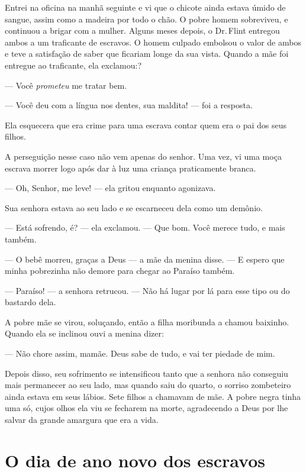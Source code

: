 Entrei na oficina na manhã seguinte e
vi que o chicote ainda estava úmido de sangue, assim como a madeira por
todo o chão. O pobre homem sobreviveu, e continuou a brigar com a
mulher. Alguns meses depois, o Dr.\,Flint entregou ambos a um traficante
de escravos. O homem culpado embolsou o valor de ambos e teve a
satisfação de saber que ficariam longe da sua vista. Quando a mãe foi
entregue ao traficante, ela exclamou:?

--- Você \emph{prometeu} me tratar bem.

--- Você deu com a língua nos dentes, sua maldita! --- foi a resposta.

Ela esquecera que era crime para uma escrava contar quem era o pai dos
seus filhos.

A perseguição nesse caso não vem apenas
do senhor. Uma vez, vi uma moça escrava morrer logo após dar à luz uma
criança praticamente branca.

--- Oh, Senhor, me leve! --- ela gritou enquanto agonizava.

Sua senhora estava ao seu lado e se escarneceu dela como um demônio.

--- Está sofrendo, é? --- ela exclamou. --- Que bom. Você merece tudo, e
mais também.

--- O bebê morreu, graças a Deus --- a
mãe da menina disse. --- E espero que minha pobrezinha não demore para
chegar ao Paraíso também.

--- Paraíso! --- a senhora retrucou.
--- Não há lugar por lá para esse tipo ou do bastardo dela.

A pobre mãe se virou, soluçando, então
a filha moribunda a chamou baixinho. Quando ela se inclinou ouvi a
menina dizer:

--- Não chore assim, mamãe. Deus sabe de tudo, e  vai ter piedade de
mim.

Depois disso, seu sofrimento se
intensificou tanto que a senhora não conseguiu mais permanecer ao seu
lado, mas quando saiu do quarto, o sorriso zombeteiro ainda estava em
seus lábios. Sete filhos a chamavam de mãe. A pobre negra tinha uma só,
cujos olhos ela viu se fecharem na morte, agradecendo a Deus por lhe
salvar da grande amargura que era a vida.

\chapter*{O dia de ano novo dos escravos}


